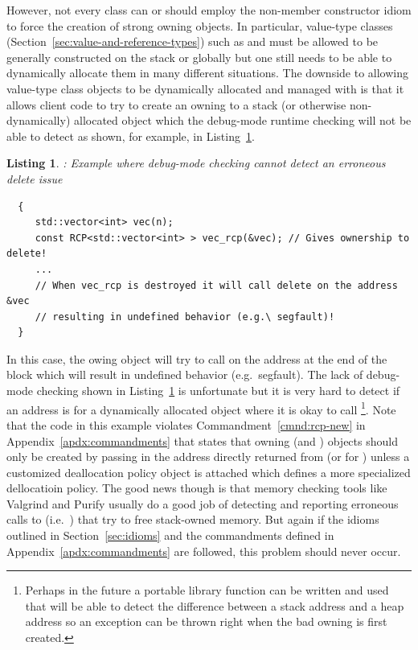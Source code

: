 \documentclass[pdf,ps2pdf,11pt]{SANDreport}
\newtheorem{listing}{Listing}
\begin{document}
However, not every class can or should employ the non-member
constructor idiom to force the creation of strong owning {}
objects.  In particular, value-type classes
(Section~\ref{sec:value-and-reference-types}) such as
{} and {} must be allowed to be
generally constructed on the stack or globally but one still needs to
be able to dynamically allocate them in many different situations.
The downside to allowing value-type class objects to be dynamically
allocated and managed with {} is that it allows client code
to try to create an owning {} to a stack (or otherwise
non-dynamically) allocated object which the debug-mode runtime
checking will not be able to detect as shown, for example, in
Listing~\ref{listing:bad-delete-error}.


{}\begin{listing}: Example where debug-mode checking cannot detect an
erroneous delete issue
\label{listing:bad-delete-error}
{\small\begin{verbatim}
  {
     std::vector<int> vec(n);
     const RCP<std::vector<int> > vec_rcp(&vec); // Gives ownership to delete!
     ...
     // When vec_rcp is destroyed it will call delete on the address &vec
     // resulting in undefined behavior (e.g.\ segfault)!
  }
\end{verbatim}}
\end{listing}


In this case, the owing {} object will try
to call {} on the address {} at the end of the
block which will result in undefined behavior (e.g.\ segfault).  The
lack of debug-mode checking shown in
Listing~\ref{listing:bad-delete-error} is unfortunate but it is very
hard to detect if an address is for a dynamically allocated object
where it is okay to call {}\footnote{Perhaps in the future
a portable library function can be written and used that will be able
to detect the difference between a stack address and a heap address so
an exception can be thrown right when the bad owning {} is
first created.  }.  Note that the code in this example violates
Commandment~\ref{cmnd:rcp-new} in Appendix~\ref{apdx:commandments}
that states that owning {} (and {}) objects
should only be created by passing in the address directly returned
from {} (or {} for {}) unless a
customized deallocation policy object is attached which defines a more
specialized dellocatioin policy.  The good news though is that memory
checking tools like Valgrind and Purify usually do a good job of
detecting and reporting erroneous calls to {} (i.e.\
{}) that try to free stack-owned memory.  But again if
the idioms outlined in Section~\ref{sec:idioms} and the commandments
defined in Appendix~\ref{apdx:commandments} are followed, this problem
should never occur.
\end{document}

